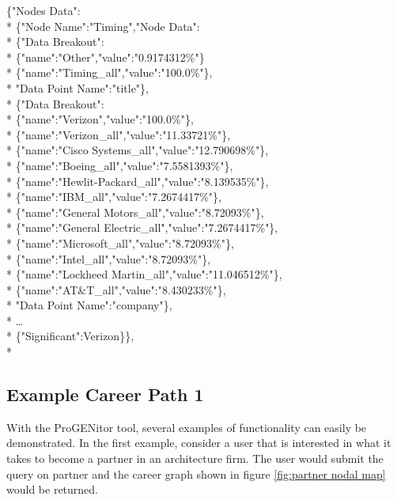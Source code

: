 \pagebreak
\begin{tt}
\begin{footnotesize}
\noindent \{"Nodes Data":\\*
	\indent \{"Node Name":"Timing","Node Data":\\*
		\indent \{"Data Breakout":\\*
		\indent \indent	\{"name":"Other","value":"0.9174312\%"\}\\*
		\indent	\indent \{"name":"Timing\_all","value":"100.0\%"\},\\*
		\indent	"Data Point Name":"title"\},\\*
		\indent\{"Data Breakout":\\*
		\indent	\indent	\{"name":"Verizon","value":"100.0\%"\},\\*
		\indent	\indent	\{"name":"Verizon\_all","value":"11.33721\%"\},\\*
		\indent	\indent	\{"name":"Cisco Systems\_all","value":"12.790698\%"\},\\*
		\indent	\indent	\{"name":"Boeing\_all","value":"7.5581393\%"\},\\*
		\indent	\indent	\{"name":"Hewlit-Packard\_all","value":"8.139535\%"\},\\*
		\indent	\indent	\{"name":"IBM\_all","value":"7.2674417\%"\},\\*
		\indent	\indent	\{"name":"General Motors\_all","value":"8.72093\%"\},\\*
		\indent	\indent	\{"name":"General Electric\_all","value":"7.2674417\%"\},\\*
		\indent	\indent	\{"name":"Microsoft\_all","value":"8.72093\%"\},\\*
		\indent	\indent	\{"name":"Intel\_all","value":"8.72093\%"\},\\*
		\indent	\indent	\{"name":"Lockheed Martin\_all","value":"11.046512\%"\},\\*
		\indent	\indent	\{"name":"AT\&T\_all","value":"8.430233\%"\},\\*
		\indent"Data Point Name":"company"\},\\*
		\indent\ldots\\*
		\indent \{"Significant":Verizon\}\},\\*
\end{footnotesize}
\end{tt}

\subsection{Example Career Path 1}
With the ProGENitor tool, several examples of functionality can easily be
demonstrated.  In the first example, consider a user that is interested in
what it takes to become a partner in an architecture firm.  The user would submit the query on
partner and the career graph shown in figure \ref{fig:partner nodal map} would
be returned.

